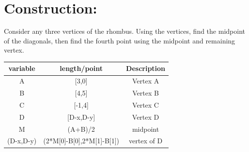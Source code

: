 \documentclass[a4paper,12pt,twocolumn]{article}
\begin{document}
\section{Construction:}
Consider any  three vertices of the rhombus. Using the vertices, find the midpoint of the diagonals, then find the fourth point using the midpoint and remaining vertex. 
\begin{table}[h]
	\centering
\setlength\extrarowheight{2pt}
	\begin{tabular}{|c|c|c|}
		\hline
		\textbf{variable} & \textbf{length/point} & \textbf{Description}\\
		\hline
		A & [3,0] & Vertex A\\
		\hline
		B & [4,5] & Vertex B\\
		\hline
		C & [-1,4] & Vertex C\\
		\hline                   
		D & [D-x,D-y] & Vertex D\\
		\hline
		M & (A+B)/2 & midpoint\\
		\hline
		(D-x,D-y) & (2*M[0]-B[0],2*M[1]-B[1]) & vertex of D\\
		\hline
	\end{tabular}
\end{table}
\end{document}
